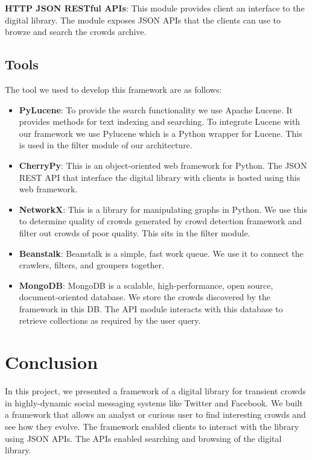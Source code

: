 \documentclass{sig-alternate}
\begin{document}
\medskip \noindent \textbf{HTTP JSON RESTful APIs}: This module provides client an interface to the digital library. The module exposes JSON APIs that the clients can use to browze and search the crowds archive.

\subsection{Tools}

The tool we used to develop this framework are as follows:
\begin{itemize}
 \item \noindent\textbf{PyLucene}: To provide the search functionality we use Apache Lucene. It provides methods for text indexing and searching. To integrate Lucene with our framework we use Pylucene which is a Python wrapper for Lucene. This is used in the filter module of our architecture.
 \item \noindent\textbf{CherryPy}: This is an object-oriented web framework for Python. The JSON REST API that interface the digital library with clients is hosted using this web framework.
 \item \noindent\textbf{NetworkX}: This is a library for manipulating graphs in Python. We use this to determine quality of crowds generated by crowd detection framework and filter out crowds of poor quality. This sits in the filter module.
  \item \noindent\textbf{Beanstalk}: Beanstalk is a simple, fast work queue. We use it to connect the crawlers, filters, and groupers together.
   \item \noindent\textbf{MongoDB}: MongoDB is a scalable, high-performance, open source, document-oriented database. We store the crowds discovered by the framework in this DB. The API module interacts with this database to retrieve collections as required by the user query.
\end{itemize}

\section{Conclusion}
\label{sec:conclusion}
In this project, we presented a framework of a digital library for transient crowds in highly-dynamic social messaging systems like Twitter and Facebook. We built a framework that allows an analyst or curious user to find interesting crowds and see how they evolve.  The framework enabled clients to interact with the library using JSON APIs. The APIs enabled searching and browsing of the digital library.

{
 
 
}
\balancecolumns %
\end{document}
